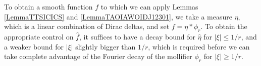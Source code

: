 \documentclass[dvipsnames,letterpaper,12pt]{article}
\numberwithin{equation}{section}
\DeclareMathOperator{\ZZ}{\mathbf{Z}}
\DeclareMathOperator{\TT}{\mathbf{T}}
\newtheorem{lemma}[theorem]{Lemma}
\numberwithin{theorem}{section}
\begin{document}
To obtain a smooth function $f$ to which we can apply Lemmas \ref{LemmaTTSICICS} and \ref{LemmaTAOIAWOIDJ12301}, we take a measure $\eta$, which is a linear combination of Dirac deltas, and set $f = \eta * \phi_r$. To obtain the appropriate control on $\widehat{f}$, it suffices to have a decay bound for $\widehat{\eta}$ for $|\xi| \leq 1/r$, and a weaker bound for $|\xi|$ slightly bigger than $1/r$, which is required before we can take complete advantage of the Fourier decay of the mollifier $\phi_r$ for $|\xi| \geq 1/r$.

\begin{comment}

\begin{lemma} \label{Lemma65493}
    Fix $C > 0$, $r,\varepsilon_1 > 0$, and $\beta \in (0,d/2]$. Consider $K$ points $x_1, \dots, x_K \in \TT^d$ such that for each $\xi \in \ZZ^d$ with $0 < |\xi| \leq 1/r^{1+\varepsilon_1}$,
    \begin{equation} \label{equationOIJDOIJIO}
        \left| \frac{1}{K} \sum_{i = 1}^K e^{2 \pi i x_i \cdot \xi} \right| \leq C |\xi|^{-\beta}.
    \end{equation}
    Then if we define
    \[ f(x) = \frac{1}{K} \sum_{i = 1}^K \phi_{r}(x - x_i), \]
    then $\| f \|_{M(\beta-\varepsilon_1)} \lesssim_{d,\varepsilon_1} C$.
\end{lemma}
\begin{proof}
    Set
    \[ D(x) = \frac{1}{K} \sum_{i = 1}^K \delta(x - x_i), \]
    then \eqref{equationOIJDOIJIO} is equivalent to the property that for each $\xi \in \ZZ^d$ with $0 < |\xi| \leq 1/r^{1 + \varepsilon_1}$,
    \begin{equation} \label{equationFFOSOXPFFGHI}
        |\widehat{D}(\xi)| \leq C |\xi|^{-\beta}.
    \end{equation}
    Noting that $f = D * \phi_{r}$, we conclude that
    \begin{equation} \label{equation6666GGCIS}
        |\widehat{f}| = |\widehat{D}| |\widehat{\phi_{r}}|.
    \end{equation}
    For $0 < |\xi| \leq 1/r^{1 + \varepsilon_1}$, we combine \eqref{equationFFOSOXPFFGHI}, \eqref{equation6666GGCIS} and \eqref{equationDIOJAOIJVIV23242} to conclude that
    \begin{equation} \label{equationGGIOHISI99234}
        |\widehat{f}(\xi)| \leq C |\xi|^{-\beta} \leq C |\xi|^{\varepsilon_1 - \beta}.
    \end{equation}
    For $|\xi| \geq 1/r^{1 + \varepsilon_1}$, we note that \eqref{molificationdecaybound} implies $\widehat{\phi_{r}}(\xi) \lesssim_T r^{-T} |\xi|^{-T}$, and so if $T \geq \beta$,
    \begin{equation} \label{equationDIICCCJSXVVM21}
        |\widehat{f}(\xi)| \lesssim_T [r^{-T} |\xi|^{\beta-T}] |\xi|^{-\beta} \leq [r^{-T} r^{-(1+\varepsilon_1)(\beta-T)}] |\xi|^{-\beta} \leq r^{-(1+\varepsilon_1) \beta + \varepsilon_1 T} |\xi|^{-\beta}.
    \end{equation}
    Setting $T = (1 + 1/\varepsilon_1) \cdot \beta$ gives $|\widehat{f}(\xi)| \lesssim_{\varepsilon_1,d} |\xi|^{-\beta}$.
\end{proof}


\end{comment}
\end{document}
